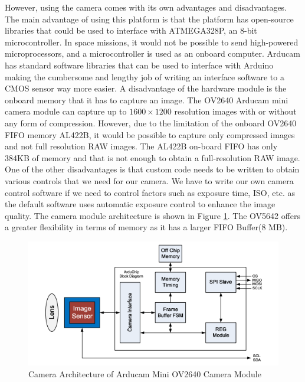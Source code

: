 However, using the camera comes with its own advantages and disadvantages. The main advantage of using this platform is that the platform has open-source libraries that could be used to interface with ATMEGA328P, an 8-bit microcontroller. In space missions, it would not be possible to send high-powered microprocessors, and a microcontroller is used as an onboard computer. Arducam has standard software libraries that can be used to interface with Arduino making the cumbersome and lengthy job of writing an interface software to a CMOS sensor way more easier.  A disadvantage of the hardware module is the onboard memory that it has to capture an image. The OV2640 Arducam mini camera module can capture up to $1600 \times 1200$ resolution images with or without any form of compression. However, due to the limitation of the onboard OV2640 FIFO memory AL422B, it would be possible to capture only compressed images and not full resolution RAW images. The AL422B on-board FIFO has only 384KB of memory and that is not enough to obtain a full-resolution RAW image. One of the other disadvantages is that custom code needs to be written to obtain various controls that we need for our camera. We have to write our own camera control software if we need to control factors such as exposure time, ISO, etc. as the default software uses automatic exposure control to enhance the image quality. The camera module architecture is shown in Figure \ref{fig:arducam_arch}. The OV5642 offers a greater flexibility in terms of memory as it has a larger FIFO Buffer(8 MB).

 \begin{figure}[!htbp]
\centering
\includegraphics[scale=0.75]{pics/arducam_architecture}
\caption{Camera Architecture of Arducam Mini OV2640 Camera Module}
\label{fig:arducam_arch}
\end{figure}


